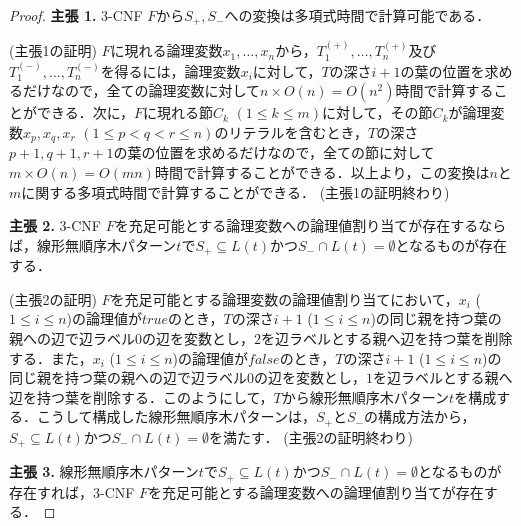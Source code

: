\begin{proof}
\noindent
\textbf{主張 1.}
3-CNF $F$から$S_{+}, S_{-}$への変換は多項式時間で計算可能である．
\smallskip

\noindent
(主張1の証明)
$F$に現れる論理変数$x_{1},\ldots,x_{n}$から，$T_{1}^{(+)},\ldots,T_{n}^{(+)}$及び$T_{1}^{(-)},\ldots,T_{n}^{(-)}$を得るには，論理変数$x_{i}$に対して，$T$の深さ$i+1$の葉の位置を求めるだけなので，全ての論理変数に対して$n\times O(n) = O(n^{2})$時間で計算することができる．次に，$F$に現れる節$C_k$ $(1\leq k\leq m)$に対して，その節$C_k$が論理変数$x_p,x_q,x_r$ $(1\leq p < q < r \leq n)$のリテラルを含むとき，$T$の深さ$p+1, q+1, r+1$の葉の位置を求めるだけなので，全ての節に対して$m\times O(n) = O(mn)$時間で計算することができる．以上より，この変換は$n$と$m$に関する多項式時間で計算することができる．
(主張1の証明終わり)

\medskip

\noindent
\textbf{主張 2.}
3-CNF $F$を充足可能とする論理変数への論理値割り当てが存在するならば，線形無順序木パターン$t$で$S_{+}\subseteq L(t)$かつ$S_{-}\cap L(t)=\emptyset$となるものが存在する．
\smallskip

\noindent
(主張2の証明)
$F$を充足可能とする論理変数の論理値割り当てにおいて，$x_{i}$ ($1\leq i\leq n$)の論理値が$true$のとき，$T$の深さ$i+1$ ($1\leq i\leq n$)の同じ親を持つ葉の親への辺で辺ラベル$0$の辺を変数とし，$2$を辺ラベルとする親へ辺を持つ葉を削除する．また，$x_{i}$ ($1\leq i\leq n$)の論理値が$false$のとき，$T$の深さ$i+1$ ($1\leq i\leq n$)の同じ親を持つ葉の親への辺で辺ラベル$0$の辺を変数とし，$1$を辺ラベルとする親へ辺を持つ葉を削除する．このようにして，$T$から線形無順序木パターン$t$を構成する．こうして構成した線形無順序木パターンは，$S_{+}$と$S_{-}$の構成方法から，$S_{+}\subseteq L(t)$かつ$S_{-}\cap L(t)=\emptyset$を満たす．
(主張2の証明終わり)

\medskip

\noindent
\textbf{主張 3.}
線形無順序木パターン$t$で$S_{+}\subseteq L(t)$かつ$S_{-}\cap L(t)=\emptyset$となるものが存在すれば，3-CNF $F$を充足可能とする論理変数への論理値割り当てが存在する．
\smallskip


\end{proof}

